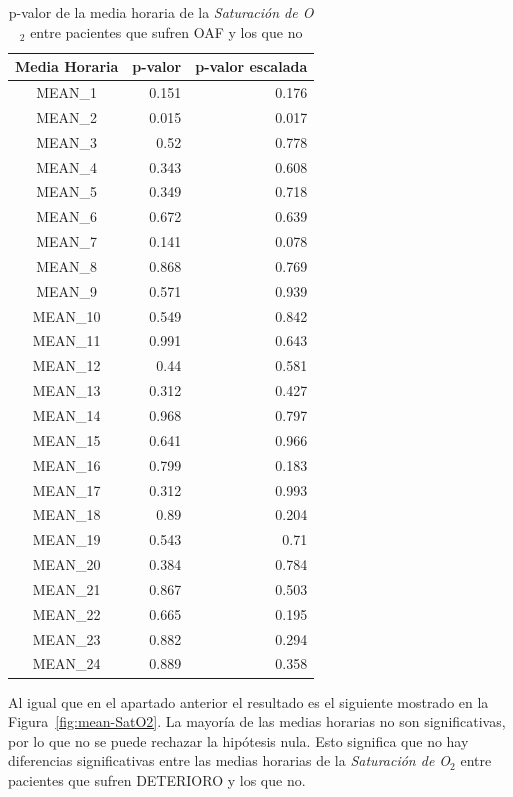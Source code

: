 \begin{table}[H]
    \centering
    \begin{tabular}{|c|r|r|}
        \hline
        \textbf{Media Horaria} & \textbf{p-valor} & \textbf{p-valor escalada} \\
        \hline
        MEAN\_1 & 0.151 & 0.176 \\
        MEAN\_2 & 0.015 & 0.017 \\
        MEAN\_3 & 0.52 & 0.778 \\
        MEAN\_4 & 0.343 & 0.608 \\
        MEAN\_5 & 0.349 & 0.718 \\
        MEAN\_6 & 0.672 & 0.639 \\
        MEAN\_7 & 0.141 & 0.078 \\
        MEAN\_8 & 0.868 & 0.769 \\
        MEAN\_9 & 0.571 & 0.939 \\
        MEAN\_10 & 0.549 & 0.842 \\
        MEAN\_11 & 0.991 & 0.643 \\
        MEAN\_12 & 0.44 & 0.581 \\
        MEAN\_13 & 0.312 & 0.427 \\
        MEAN\_14 & 0.968 & 0.797 \\
        MEAN\_15 & 0.641 & 0.966 \\
        MEAN\_16 & 0.799 & 0.183 \\
        MEAN\_17 & 0.312 & 0.993 \\
        MEAN\_18 & 0.89 & 0.204 \\
        MEAN\_19 & 0.543 & 0.71 \\
        MEAN\_20 & 0.384 & 0.784 \\
        MEAN\_21 & 0.867 & 0.503 \\
        MEAN\_22 & 0.665 & 0.195 \\
        MEAN\_23 & 0.882 & 0.294 \\
        MEAN\_24 & 0.889 & 0.358 \\
        \hline
    \end{tabular}
    \caption{p-valor de la media horaria de la \textit{Saturación de O$_2$} entre pacientes que sufren OAF y los que no}\label{tab:mean-SatO2}
\end{table}

Al igual que en el apartado anterior el resultado es el siguiente mostrado en la Figura~\ref{fig:mean-SatO2}. La mayoría de las medias horarias no son significativas, por lo que no se puede rechazar la hipótesis nula. Esto significa que no hay diferencias significativas entre las medias horarias de la \textit{Saturación de O$_2$} entre pacientes que sufren DETERIORO y los que no.

